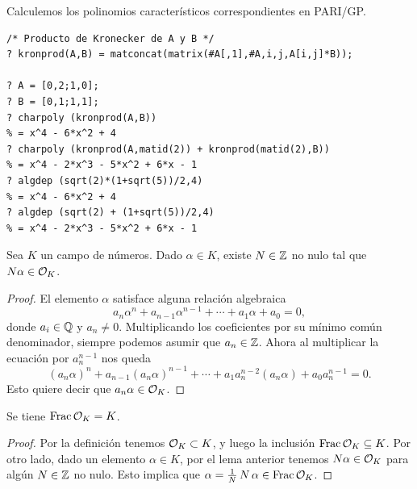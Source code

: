 \begin{comentario}
  Calculemos los polinomios característicos correspondientes en PARI/GP.
  \begin{shaded}
\begin{verbatim}
/* Producto de Kronecker de A y B */
? kronprod(A,B) = matconcat(matrix(#A[,1],#A,i,j,A[i,j]*B));

? A = [0,2;1,0];
? B = [0,1;1,1];
? charpoly (kronprod(A,B))
% = x^4 - 6*x^2 + 4
? charpoly (kronprod(A,matid(2)) + kronprod(matid(2),B))
% = x^4 - 2*x^3 - 5*x^2 + 6*x - 1
? algdep (sqrt(2)*(1+sqrt(5))/2,4)
% = x^4 - 6*x^2 + 4
? algdep (sqrt(2) + (1+sqrt(5))/2,4)
% = x^4 - 2*x^3 - 5*x^2 + 6*x - 1
\end{verbatim}
  \end{shaded}
\end{comentario}


\begin{lema}
  \label{lema:N-alpha-esta-en-OK}
  Sea $K$ un campo de números. Dado $\alpha \in K$, existe $N \in \mathbb{Z}$ no nulo
  tal que $N\alpha \in \mathcal{O}_K$.

  \begin{proof}
    El elemento $\alpha$ satisface alguna relación algebraica
    $$a_n \alpha^n + a_{n-1} \alpha^{n-1} + \cdots + a_1 \alpha + a_0 = 0,$$   
    donde $a_i \in \mathbb{Q}$ y $a_n \ne 0$. Multiplicando los coeficientes por su
    mínimo común denominador, siempre podemos asumir que $a_n \in \mathbb{Z}$. Ahora
    al multiplicar la ecuación por $a_n^{n-1}$ nos queda
    \[ (a_n \alpha)^n + a_{n-1} (a_n \alpha)^{n-1} + \cdots +
           a_1 a_n^{n-2} (a_n \alpha) + a_0 a_n^{n-1} = 0. \]
    Esto quiere decir que $a_n \alpha \in \mathcal{O}_K$.
  \end{proof}
\end{lema}

\begin{proposicion}
  Se tiene $\operatorname{Frac}\mathcal{O}_K = K$.

  \begin{proof}
    Por la definición tenemos $\mathcal{O}_K \subset K$, y luego la inclusión
    $\operatorname{Frac} \mathcal{O}_K \subseteq K$. Por otro lado, dado un elemento $\alpha \in K$,
    por el lema anterior tenemos $N\alpha \in \mathcal{O}_K$ para algún $N \in \mathbb{Z}$
    no nulo. Esto implica que $\alpha = \frac{1}{N}\,N\,\alpha \in \operatorname{Frac}\mathcal{O}_K$.
  \end{proof}
\end{proposicion}

